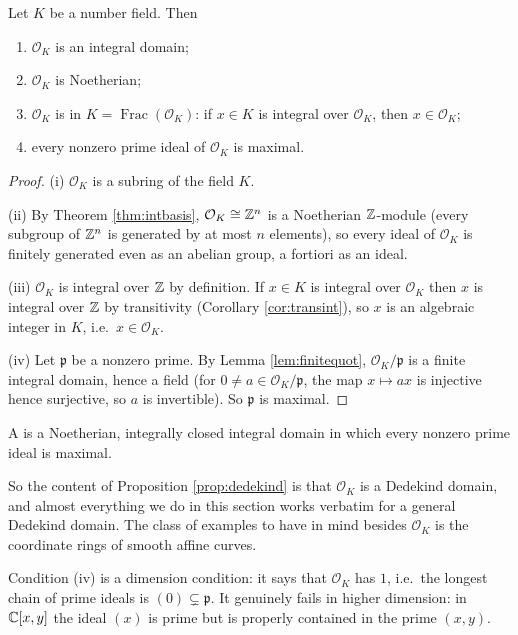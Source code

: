 \documentclass[a4paper]{scrartcl}
\renewcommand{\OO}{\mathcal{O}}
\newcommand{\Frac}{\operatorname{Frac}}
\newcommand{\fp}{\mathfrak{p}}
\begin{document}
\begin{proposition}\label{prop:dedekind}
	Let $K$ be a number field. Then
	\begin{enumerate}[label=(\roman*)]
		\item $\OO_K$ is an integral domain;
		\item $\OO_K$ is Noetherian;
		\item $\OO_K$ is  in $K = \Frac(\OO_K)$: if $x \in K$ is integral over $\OO_K$, then $x \in \OO_K$;
		\item every nonzero prime ideal of $\OO_K$ is maximal.
	\end{enumerate}
\end{proposition}

\begin{proof}
	(i) $\OO_K$ is a subring of the field $K$.

	(ii) By Theorem \ref{thm:intbasis}, $\OO_K \cong \Z^n$ is a Noetherian $\mathbb{Z}$-module (every subgroup of $\mathbb{Z}^n$ is generated by at most $n$ elements), so every ideal of $\OO_K$ is finitely generated even as an abelian group, a fortiori as an ideal.

	(iii) $\OO_K$ is integral over $\mathbb{Z}$ by definition. If $x \in K$ is integral over $\OO_K$ then $x$ is integral over $\mathbb{Z}$ by transitivity (Corollary \ref{cor:transint}), so $x$ is an algebraic integer in $K$, i.e.\ $x \in \OO_K$.

	(iv) Let $\fp$ be a nonzero prime. By Lemma \ref{lem:finitequot}, $\OO_K/\fp$ is a finite integral domain, hence a field (for $0 \neq a \in \OO_K/\fp$, the map $x \mapsto ax$ is injective hence surjective, so $a$ is invertible). So $\fp$ is maximal.
\end{proof}

\begin{definition}
	A  is a Noetherian, integrally closed integral domain in which every nonzero prime ideal is maximal.
\end{definition}

So the content of Proposition \ref{prop:dedekind} is that $\OO_K$ is a Dedekind domain, and almost everything we do in this section works verbatim for a general Dedekind domain. The class of examples to have in mind besides $\OO_K$ is the coordinate rings of smooth affine curves.

\begin{remark}
	Condition (iv) is a dimension condition: it says that $\OO_K$ has  $1$, i.e.\ the longest chain of prime ideals is $(0) \subsetneq \fp$. It genuinely fails in higher dimension: in $\mathbb{C}[x,y]$ the ideal $(x)$ is prime but is properly contained in the prime $(x,y)$.
\end{remark}
\end{document}
